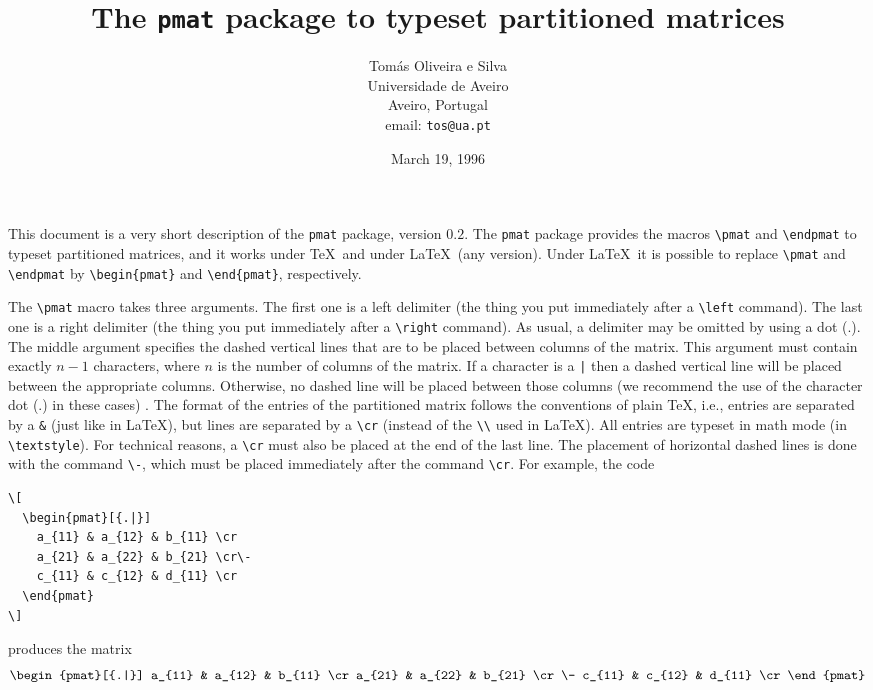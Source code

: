 \documentclass[a4paper]{article}
\begin{document}
\title{The \texttt{pmat} package to typeset partitioned matrices}
\author{Tom\'as Oliveira e Silva \\[4pt] Universidade de Aveiro \\
  Aveiro, Portugal \\[8pt] email: \texttt{tos@ua.pt}}
\date{March 19, 1996}
\maketitle

This document is a very short description of the \texttt{pmat} package,
version $0.2$. The \texttt{pmat} package provides the macros \verb+\pmat+
and \verb+\endpmat+ to typeset partitioned matrices, and it works under
\TeX\ and under \LaTeX\ (any version). Under \LaTeX\ it is possible to replace
\verb+\pmat+ and \verb+\endpmat+ by \verb+\begin{pmat}+ and \verb+\end{pmat}+,
respectively.

The \verb+\pmat+ macro takes three arguments. The first one is a left
delimiter (the thing you put immediately after a \verb+\left+ command).
The last one is a right delimiter (the thing you put immediately after a
\verb+\right+ command). As usual, a delimiter may be omitted by using a dot
(.). The middle argument specifies the dashed vertical lines that are to be
placed between columns of the matrix. This argument must contain exactly $n-1$
characters, where $n$ is the number of columns of the matrix. If a character
is a \verb+|+ then a dashed vertical line will be placed between the
appropriate columns. Otherwise, no dashed line will be placed between those
columns (we recommend the use of the character dot (.) in these cases) . The
format of the entries of the partitioned matrix follows the conventions of
plain \TeX, i.e., entries are separated by a \verb+&+ (just like in \LaTeX),
but lines are separated by a \verb+\cr+ (instead of the \verb+\\+ used in
\LaTeX). All entries are typeset in math mode (in \verb+\textstyle+). For
technical reasons, a \verb+\cr+ must also be placed at the end of the last
line. The placement of horizontal dashed lines is done with the command
\verb+\-+, which must be placed immediately after the command \verb+\cr+. For
example, the code
\begin{verbatim}
\[
  \begin{pmat}[{.|}]
    a_{11} & a_{12} & b_{11} \cr
    a_{21} & a_{22} & b_{21} \cr\-
    c_{11} & c_{12} & d_{11} \cr
  \end{pmat}
\]
\end{verbatim}
produces the matrix
\[
  \begin{pmat}[{.|}]
    a_{11} & a_{12} & b_{11} \cr
    a_{21} & a_{22} & b_{21} \cr\-
    c_{11} & c_{12} & d_{11} \cr
  \end{pmat}
\]
\end{document}
